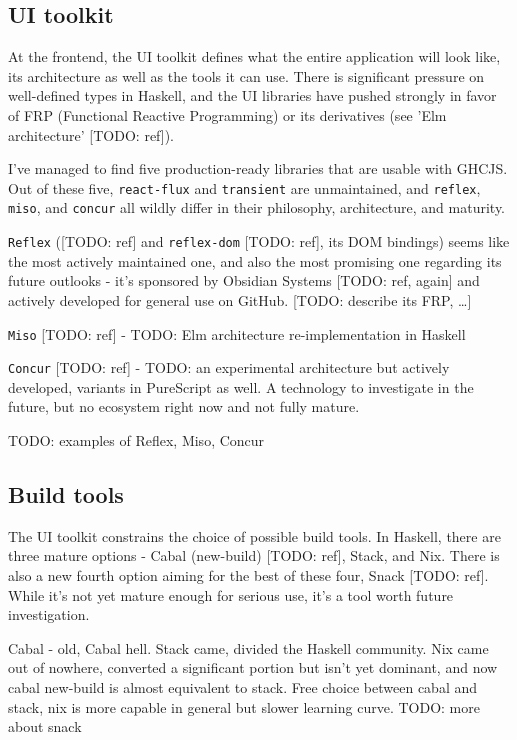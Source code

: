 \documentclass[english,odsaz]{fitthesis}
\begin{document}
\subsection{UI toolkit}
\label{sec:orgfb5f79d}
At the frontend, the UI toolkit defines what the entire application will look
like, its architecture as well as the tools it can use. There is significant
pressure on well-defined types in Haskell, and the UI libraries have pushed
strongly in favor of FRP (Functional Reactive Programming) or its derivatives
(see 'Elm architecture' [TODO: ref]).

I've managed to find five production-ready libraries that are usable with
GHCJS. Out of these five, \texttt{react-flux} and \texttt{transient} are unmaintained, and \texttt{reflex},
\texttt{miso}, and \texttt{concur} all wildly differ in their philosophy, architecture, and
maturity.

\texttt{Reflex} ([TODO: ref] and \texttt{reflex-dom} [TODO: ref], its DOM bindings) seems like the
most actively maintained one, and also the most promising one regarding its
future outlooks - it's sponsored by Obsidian Systems [TODO: ref, again] and
actively developed for general use on GitHub. [TODO: describe its FRP, \ldots{}]

\texttt{Miso} [TODO: ref] - TODO: Elm architecture re-implementation in Haskell

\texttt{Concur} [TODO: ref] - TODO: an experimental architecture but actively developed,
variants in PureScript as well. A technology to investigate in the future, but
no ecosystem right now and not fully mature.

TODO: examples of Reflex, Miso, Concur

\subsection{Build tools}
\label{sec:org4af2283}
The UI toolkit constrains the choice of possible build tools. In Haskell, there
are three mature options - Cabal (new-build) [TODO: ref], Stack, and Nix. There
is also a new fourth option aiming for the best of these four, Snack [TODO:
ref]. While it's not yet mature enough for serious use, it's a tool worth future
investigation.

Cabal - old, Cabal hell. Stack came, divided the Haskell community. Nix came out
of nowhere, converted a significant portion but isn't yet dominant, and now
cabal new-build is almost equivalent to stack. Free choice between cabal and
stack, nix is more capable in general but slower learning curve. TODO: more
about snack
\end{document}
